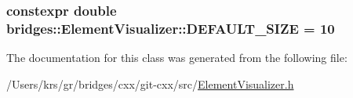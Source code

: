 \subsubsection[{D\+E\+F\+A\+U\+L\+T\+\_\+\+S\+I\+Z\+E}]{\setlength{\rightskip}{0pt plus 5cm}constexpr double bridges\+::\+Element\+Visualizer\+::\+D\+E\+F\+A\+U\+L\+T\+\_\+\+S\+I\+Z\+E = 10\hspace{0.3cm}{\ttfamily [static]}}\label{classbridges_1_1_element_visualizer_a81cc788d6149d5d582099cbc35e18c5a}


The documentation for this class was generated from the following file\+:\begin{DoxyCompactItemize}
\item 
/\+Users/krs/gr/bridges/cxx/git-\/cxx/src/\hyperlink{_element_visualizer_8h}{Element\+Visualizer.\+h}\end{DoxyCompactItemize}
